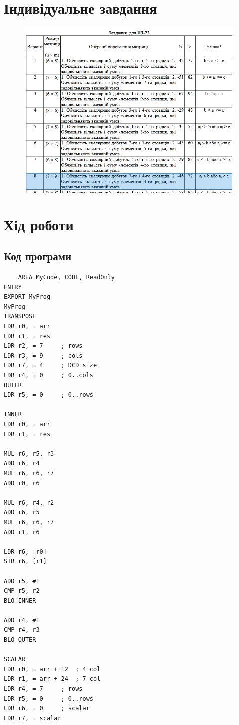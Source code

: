 \documentclass{article}
\begin{document}
\begin{normalsize}
		\section*{Індивідуальне завдання}
		\begin{figure}[H]
			\centering
			\includegraphics[scale=0.7]{v}
		\end{figure}
		
		\section*{Хід роботи}
		\subsection*{Код програми}
		\begin{lstlisting}
	AREA MyCode, CODE, ReadOnly
ENTRY
EXPORT MyProg
MyProg
TRANSPOSE
LDR r0, = arr
LDR r1, = res
LDR r2, = 7		; rows
LDR r3, = 9		; cols
LDR r7, = 4		; DCD size
LDR r4, = 0		; 0..cols
OUTER
LDR r5, = 0		; 0..rows

INNER
LDR r0, = arr
LDR r1, = res

MUL r6, r5, r3
ADD r6, r4
MUL r6, r6, r7
ADD r0, r6

MUL r6, r4, r2
ADD r6, r5
MUL r6, r6, r7
ADD r1, r6	

LDR r6, [r0]
STR r6, [r1]

ADD r5, #1	
CMP r5, r2
BLO INNER

ADD r4, #1	
CMP r4, r3
BLO OUTER

SCALAR
LDR r0, = arr + 12	; 4 col
LDR r1, = arr + 24	; 7 col
LDR r4, = 7		; rows
LDR r5, = 0		; 0..rows
LDR r6, = 0		; scalar
LDR r7, = scalar


\end{lstlisting}
\end{normalsize}
\end{document}
